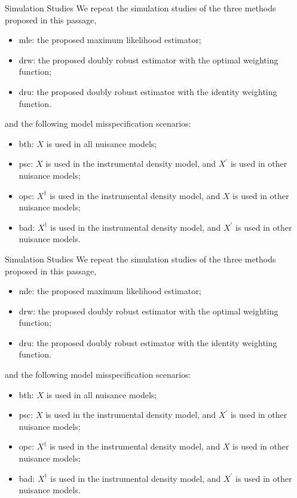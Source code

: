 \documentclass[aspectratio=169,xcolor=dvipsnames]{beamer}
\begin{document}
\begin{frame}{Simulation Studies}
We repeat the simulation studies of the three methods proposed in this passage,
\begin{itemize}
\item mle: the proposed maximum likelihood estimator;
\item drw: the proposed doubly robust estimator with the optimal weighting function;
\item dru: the proposed doubly robust estimator with the identity weighting function.
\end{itemize}

and the following model misspecification scenarios:
\begin{itemize}
\item bth: $X$ is used in all nuisance models;
\item psc: $X$ is used in the instrumental density model, and $X^{\prime}$ is used in other nuisance models; 
\item opc: $X^{\dagger}$ is used in the instrumental density model, and $X$ is used in other nuisance models; 
\item bad: $X^{\dagger}$ is used in the instrumental density model, and $X^{\prime}$ is used in other nuisance models.
\end{itemize}
\end{frame}

\begin{frame}{Simulation Studies}
We repeat the simulation studies of the three methods proposed in this passage,
\begin{itemize}
\item mle: the proposed maximum likelihood estimator;
\item drw: the proposed doubly robust estimator with the optimal weighting function;
\item dru: the proposed doubly robust estimator with the identity weighting function.
\end{itemize}

and the following model misspecification scenarios:
\begin{itemize}
\item bth: $X$ is used in all nuisance models;
\item psc: $X$ is used in the instrumental density model, and $X^{\prime}$ is used in other nuisance models; 
\item opc: $X^{\dagger}$ is used in the instrumental density model, and $X$ is used in other nuisance models; 
\item bad: $X^{\dagger}$ is used in the instrumental density model, and $X^{\prime}$ is used in other nuisance models.
\end{itemize}
\end{frame}
\end{document}

